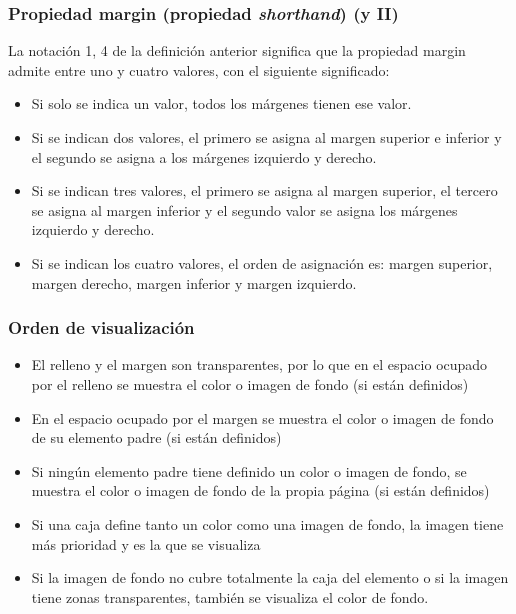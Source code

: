 
\begin{frame}
\frametitle{Propiedad margin (propiedad \emph{shorthand}) (y II)}

La notación {1, 4} de la definición anterior significa que la propiedad margin admite entre uno y cuatro valores, con el siguiente significado:

\begin{itemize}
  \item Si solo se indica un valor, todos los márgenes tienen ese valor.
  \item Si se indican dos valores, el primero se asigna al margen superior e inferior y el segundo se asigna a los márgenes izquierdo y derecho.
  \item Si se indican tres valores, el primero se asigna al margen superior, el tercero se asigna al margen inferior y el segundo valor se asigna los márgenes izquierdo y derecho.
  \item Si se indican los cuatro valores, el orden de asignación es: margen superior, margen derecho, margen inferior y margen izquierdo.
\end{itemize}

\end{frame}





\begin{frame}
\frametitle{Orden de visualización}

\begin{itemize}
  \item El relleno y el margen son transparentes, por lo que en el espacio ocupado por el relleno se muestra el color o imagen de fondo (si están definidos)
  \item En el espacio ocupado por el margen se muestra el color o imagen de fondo de su elemento padre (si están definidos)
  \item Si ningún elemento padre tiene definido un color o imagen de fondo, se muestra el color o imagen de fondo de la propia página (si están definidos)
  \item Si una caja define tanto un color como una imagen de fondo, la imagen tiene más prioridad y es la que se visualiza
  \item Si la imagen de fondo no cubre totalmente la caja del elemento o si la imagen tiene zonas transparentes, también se visualiza el color de fondo. 
\end{itemize}

\end{frame}



